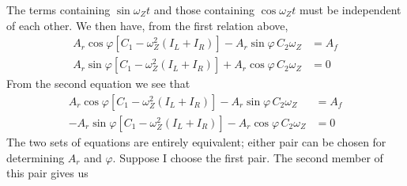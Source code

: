 The terms containing $\sin\omega_Z t$ and those containing $\cos\omega_Z t$
must be independent of each other. We then have, from the first relation
above,
\begin{align*}
A_r\cos\varphi\left[C_1 - \omega_Z^{2}(I_L + I_R)\right]
  - A_r\sin\varphi\, C_2\omega_Z &= A_f\\
A_r\sin\varphi\left[C_1 - \omega_Z^{2}(I_L + I_R)\right]
  + A_r\cos\varphi\, C_2\omega_Z &= 0
\end{align*}
From the second equation we see that
\begin{align*}
A_r\cos\varphi\left[C_1 - \omega_Z^{2}(I_L + I_R)\right]
  - A_r\sin\varphi\, C_2\omega_Z &= A_f\\
-A_r\sin\varphi\left[C_1 - \omega_Z^{2}(I_L + I_R)\right]
  - A_r\cos\varphi\, C_2\omega_Z &= 0
\end{align*}
The two sets of equations are entirely equivalent; either pair can be chosen
for determining $A_r$ and $\varphi$. Suppose I choose the first pair. The
second member of this pair gives us
